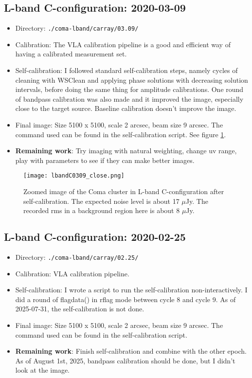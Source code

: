 \documentclass[11pt,letterpaper]{article}
\begin{document}
\subsection{L-band C-configuration: 2020-03-09}
\begin{itemize}
    \item Directory: \verb|./coma-lband/carray/03.09/|
    \item Calibration: The VLA calibration pipeline is a good and efficient way of having a calibrated measurement set.
    \item Self-calibration: I followed standard self-calibration steps, namely cycles of cleaning with WSClean and applying phase solutions with decreasing solution intervals, before doing the same thing for amplitude calibrations. One round of bandpass calibration was also made and it improved the image, especially close to the target source. Baseline calibration doesn't improve the image.
    \item Final image: Size 5100 x 5100, scale 2 arcsec, beam size 9 arcsec. The command used can be found in the self-calibration script. See figure \ref{fig:lbandC0309}.
    \item \textbf{Remaining work}: Try imaging with natural weighting, change uv range, play with parameters to see if they can make better images.
\end{itemize}
\begin{figure}[t]
    \centering
    \texttt{[image: lbandC0309\_close.png]}
    \caption{Zoomed image of the Coma cluster in L-band C-configuration after self-calibration. The expected noise level is about 17 $\mu$Jy. The recorded rms in a background region here is about 8 $\mu$Jy.}
    \label{fig:lbandC0309}
\end{figure}

\subsection{L-band C-configuration: 2020-02-25}
\begin{itemize}
    \item Directory: \verb|./coma-lband/carray/02.25/|
    \item Calibration: VLA calibration pipeline.
    \item Self-calibration: I wrote a script to run the self-calibration non-interactively. I did a round of flagdata() in rflag mode between cycle 8 and cycle 9. As of 2025-07-31, the self-calibration is not done.
    \item Final image: Size 5100 x 5100, scale 2 arcsec, beam size 9 arcsec. The command used can be found in the self-calibration script.
    \item \textbf{Remaining work}: Finish self-calibration and combine with the other epoch. As of August 1st, 2025, bandpass calibration should be done, but I didn't look at the image. 
\end{itemize}
\end{document}
